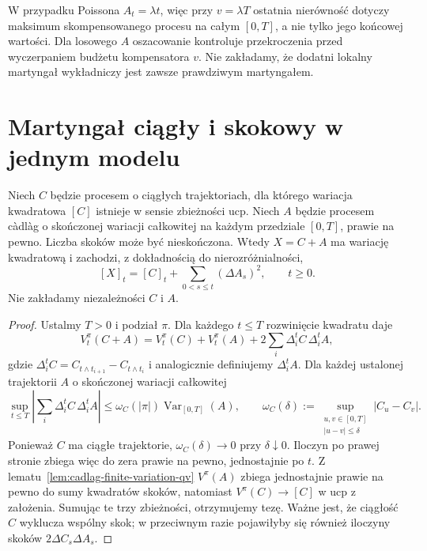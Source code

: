 \begin{uwaga}
W przypadku Poissona $A_t=\lambda t$,
więc przy $v=\lambda T$ ostatnia nierówność
dotyczy maksimum skompensowanego procesu
na całym $[0,T]$, a nie tylko jego końcowej
wartości. Dla losowego $A$ oszacowanie
kontroluje przekroczenia przed wyczerpaniem
budżetu kompensatora $v$.
Nie zakładamy, że dodatni lokalny martyngał
wykładniczy jest zawsze prawdziwym martyngałem.
\end{uwaga}

\section{Martyngał ciągły i skokowy w jednym modelu}

\begin{twierdzenie}
\label{thm:finite-variation-jumps-bracket}
Niech $C$ będzie procesem o ciągłych trajektoriach, dla którego
wariacja kwadratowa $[C]$ istnieje w sensie zbieżności ucp.
Niech $A$ będzie procesem c\`adl\`ag o skończonej wariacji
całkowitej na każdym przedziale $[0,T]$, prawie na pewno.
Liczba skoków może być nieskończona. Wtedy $X=C+A$ ma wariację
kwadratową i zachodzi, z dokładnością do nierozróżnialności,
\[
[X]_t=[C]_t+\sum_{0<s\le t}(\Delta A_s)^2,
\qquad t\ge0.
\]
Nie zakładamy niezależności $C$ i $A$.
\end{twierdzenie}
\begin{proof}
Ustalmy $T>0$ i podział $\pi$. Dla każdego $t\le T$
rozwinięcie kwadratu daje
\[
V_t^\pi(C+A)=V_t^\pi(C)+V_t^\pi(A)
 +2\sum_i\Delta_i^tC\,\Delta_i^tA,
\]
gdzie $\Delta_i^tC=C_{t\wedge t_{i+1}}-C_{t\wedge t_i}$
i analogicznie definiujemy $\Delta_i^tA$. Dla każdej
ustalonej trajektorii $A$ o skończonej wariacji całkowitej
\[
\sup_{t\le T}\left|\sum_i\Delta_i^tC\,\Delta_i^tA\right|
\le \omega_C(|\pi|)\operatorname{Var}_{[0,T]}(A),
\qquad
\omega_C(\delta):=
\sup_{\substack{u,v\in[0,T]\\|u-v|\le\delta}}|C_u-C_v|.
\]
Ponieważ $C$ ma ciągłe trajektorie, $\omega_C(\delta)\to0$
przy $\delta\downarrow0$. Iloczyn po prawej stronie zbiega
więc do zera prawie na pewno, jednostajnie po $t$.
Z lematu~\ref{lem:cadlag-finite-variation-qv}
$V^\pi(A)$ zbiega jednostajnie
prawie na pewno do sumy kwadratów skoków, natomiast
$V^\pi(C)\to[C]$ w ucp z założenia.
Sumując te trzy zbieżności, otrzymujemy tezę.
Ważne jest, że ciągłość $C$ wyklucza wspólny skok;
w przeciwnym razie pojawiłyby się również iloczyny
skoków $2\Delta C_s\Delta A_s$.
\end{proof}

